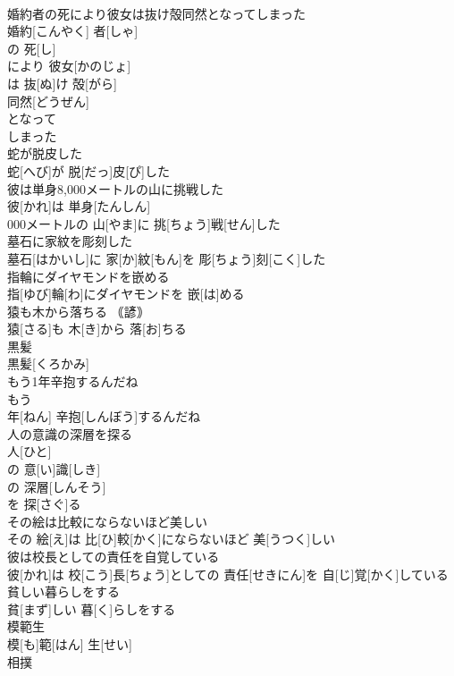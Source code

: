 \documentclass[8pt]{extreport}
\begin{document}
\begin{CJK}{UTF8}{min}
\\	婚約者の死により彼女は抜け殻同然となってしまった	
\\	婚約[こんやく] 者[しゃ]
\\	の 死[し]
\\	により 彼女[かのじょ]
\\	は 抜[ぬ]け 殻[がら]
\\	同然[どうぜん]
\\	となって 
\\	しまった 
\\	蛇が脱皮した	
\\	蛇[へび]が 脱[だっ]皮[ぴ]した
\\	彼は単身8,000メートルの山に挑戦した	
\\	彼[かれ]は 単身[たんしん] 
\\	000メートルの 山[やま]に 挑[ちょう]戦[せん]した
\\	墓石に家紋を彫刻した	
\\	墓石[はかいし]に 家[か]紋[もん]を 彫[ちょう]刻[こく]した
\\	指輪にダイヤモンドを嵌める	
\\	指[ゆび]輪[わ]にダイヤモンドを 嵌[は]める
\\	猿も木から落ちる	｟諺｠ 
\\	猿[さる]も 木[き]から 落[お]ちる
\\	黒髪	
\\	黒髪[くろかみ]
\\	もう1年辛抱するんだね	
\\	もう 
\\	年[ねん] 辛抱[しんぼう]するんだね
\\	人の意識の深層を探る	
\\	人[ひと]
\\	の 意[い]識[しき]
\\	の 深層[しんそう]
\\	を 探[さぐ]る 
\\	その絵は比較にならないほど美しい	
\\	その 絵[え]は 比[ひ]較[かく]にならないほど 美[うつく]しい
\\	彼は校長としての責任を自覚している	
\\	彼[かれ]は 校[こう]長[ちょう]としての 責任[せきにん]を 自[じ]覚[かく]している
\\	貧しい暮らしをする	
\\	貧[まず]しい 暮[く]らしをする
\\	模範生	
\\	模[も]範[はん] 生[せい]
\\	相撲	

\end{CJK}
\end{document}
